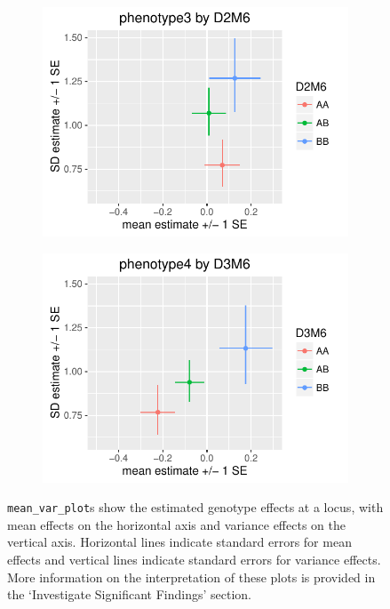 \documentclass{article}
\begin{document}
\begin{figure}[ht]
    \begin{subfigure}[t]{0.5\textwidth}
        \includegraphics[width=\textwidth]{images/mean_var_plot_phen3.pdf}
    \end{subfigure}
    \hfill
    \begin{subfigure}[t]{0.5\textwidth}
        \includegraphics[width=\textwidth]{images/mean_var_plot_phen4.pdf}
    \end{subfigure}

    \caption{\texttt{mean\_var\_plot}s show the estimated genotype effects at a locus, with mean effects on the horizontal axis and variance effects on the vertical axis.  Horizontal lines indicate standard errors for mean effects and vertical lines indicate standard errors for variance effects.  More information on the interpretation of these plots is provided in the `Investigate Significant Findings' section. \label{fig:mean_var_plots}}
\end{figure}
\end{document}
